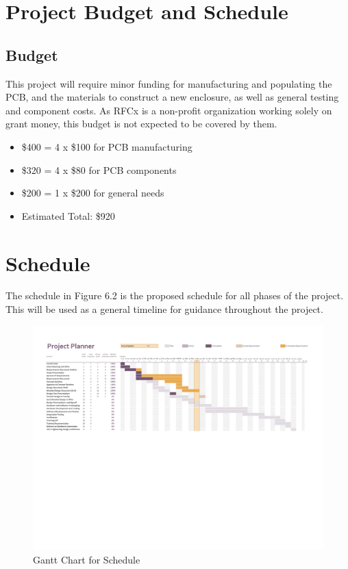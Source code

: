 \documentclass{article}
\begin{document}
{\section{Project Budget and Schedule}
\subsection{Budget}
This project will require minor funding for manufacturing and populating the PCB, and the materials to construct a new enclosure, as well as general testing and component costs. As RFCx is a non-profit organization working solely on grant money, this budget is not expected to be covered by them.
\begin{itemize}
\item \$400 = 4 x \$100 for PCB manufacturing
\item \$320 = 4 x \$80 for PCB components
\item \$200 = 1 x \$200 for general needs
\item Estimated Total: \$920
\end{itemize}

\section{Schedule}
The schedule in Figure 6.2 is the proposed schedule for all phases of the project. This will be used as a general timeline for guidance throughout the project.

\begin{figure}[H]
  \centering
  \includegraphics[scale=0.65, trim=0cm 12cm 0cm 0cm, clip=true]{Schedule.pdf}
  \caption{Gantt Chart for Schedule}
  \label{fig:gantt}
\end{figure}


}
\end{document}
